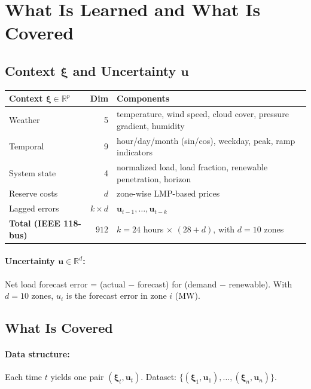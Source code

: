\documentclass[11pt]{article}
\newcommand{\R}{\mathbb{R}}
\newcommand{\bxi}{\bm{\xi}}
\newcommand{\bu}{\bm{u}}
\theoremstyle{definition}
\begin{document}
\section{What Is Learned and What Is Covered}

\subsection{Context $\bxi$ and Uncertainty $\bu$}

\begin{center}
\small
\begin{tabular}{lrl}
\toprule
\textbf{Context $\bxi \in \R^p$} & \textbf{Dim} & \textbf{Components} \\
\midrule
Weather & 5 & temperature, wind speed, cloud cover, pressure gradient, humidity \\
Temporal & 9 & hour/day/month (sin/cos), weekday, peak, ramp indicators \\
System state & 4 & normalized load, load fraction, renewable penetration, horizon \\
Reserve costs & $d$ & zone-wise LMP-based prices \\
Lagged errors & $k \times d$ & $\bu_{t-1}, \ldots, \bu_{t-k}$ \\
\midrule
\textbf{Total (IEEE 118-bus)} & $912$ & $k=24$ hours $\times$ $(28 + d)$, with $d=10$ zones \\
\bottomrule
\end{tabular}
\end{center}

\paragraph{Uncertainty $\bu \in \R^d$:} Net load forecast error = (actual $-$ forecast) for (demand $-$ renewable). With $d=10$ zones, $u_i$ is the forecast error in zone $i$ (MW).


\subsection{What Is Covered}

\paragraph{Data structure:} Each time $t$ yields one pair $(\bxi_t, \bu_t)$. Dataset: $\{(\bxi_1, \bu_1), \ldots, (\bxi_n, \bu_n)\}$.
\end{document}
